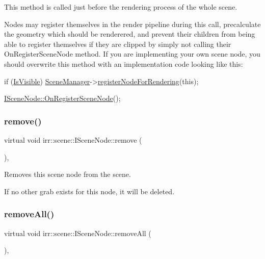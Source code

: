 This method is called just before the rendering process of the whole scene. 

Nodes may register themselves in the render pipeline during this call, precalculate the geometry which should be renderered, and prevent their children from being able to register themselves if they are clipped by simply not calling their On\+Register\+Scene\+Node method. If you are implementing your own scene node, you should overwrite this method with an implementation code looking like this\+: 
\begin{DoxyCode}
\textcolor{keywordflow}{if} (\hyperlink{classirr_1_1scene_1_1ISceneNode_aa834128c57215457914ef46d9b18cc5e}{IsVisible})
    \hyperlink{classirr_1_1scene_1_1ISceneNode_a062a201ee9b870398fe5aa8f36ce54a5}{SceneManager}->\hyperlink{classirr_1_1scene_1_1ISceneManager_aaf17bdde6d4e9ef61a76f3b43100ecb8}{registerNodeForRendering}(\textcolor{keyword}{this});

\hyperlink{classirr_1_1scene_1_1ISceneNode_ac9795bfcb88dcaf8cba6ea3296e5d8d0}{ISceneNode::OnRegisterSceneNode}();
\end{DoxyCode}
 \mbox{\label{classirr_1_1scene_1_1ISceneNode_a2efa2670e29d6bb33b0dd99403b8b69c}} 
\subsubsection{\texorpdfstring{remove()}{remove()}}
{\footnotesize\ttfamily virtual void irr\+::scene\+::\+I\+Scene\+Node\+::remove (\begin{DoxyParamCaption}{ }\end{DoxyParamCaption})\hspace{0.3cm}{\ttfamily [inline]}, {\ttfamily [virtual]}}



Removes this scene node from the scene. 

If no other grab exists for this node, it will be deleted. \mbox{\label{classirr_1_1scene_1_1ISceneNode_a348767bb5b9262d997067c50e079e5be}} 
\subsubsection{\texorpdfstring{remove\+All()}{removeAll()}}
{\footnotesize\ttfamily virtual void irr\+::scene\+::\+I\+Scene\+Node\+::remove\+All (\begin{DoxyParamCaption}{ }\end{DoxyParamCaption})\hspace{0.3cm}{\ttfamily [inline]}, {\ttfamily [virtual]}}



